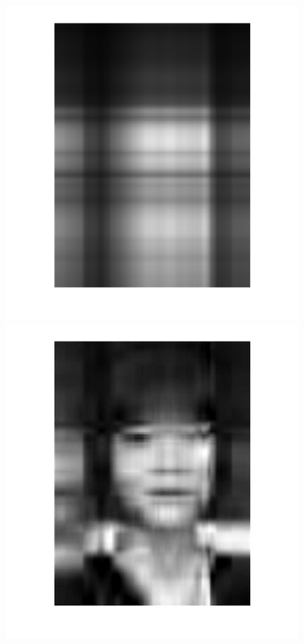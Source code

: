 \documentclass[a4paper]{article}
\theoremstyle{definition}
\theoremstyle{plain}
\begin{document}
\begin{figure}[H]
    \centering
    \includegraphics[scale=0.18]{figure/uj_1.png}
    \includegraphics[scale=0.12]{figure/uj_5.jpg}

\end{figure}
\end{document}
